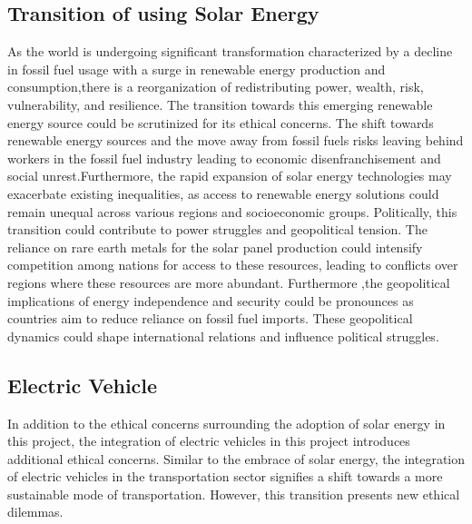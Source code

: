 \documentclass[10pt,twocolumn]{article}
\begin{document}
\subsection{Transition of using Solar Energy}
As the world is undergoing significant transformation characterized by a decline in fossil fuel usage with a surge in renewable energy production and consumption,there is a reorganization of redistributing power, wealth, risk, vulnerability, and resilience. The transition towards this emerging renewable energy source could be scrutinized for its ethical concerns. The shift towards renewable energy sources and the move away from fossil fuels risks leaving behind workers in the fossil fuel industry leading to economic disenfranchisement and social unrest.Furthermore, the rapid expansion of solar energy technologies may exacerbate existing inequalities, as access to renewable energy solutions could remain unequal across various regions and socioeconomic groups. Politically, this transition could contribute to power struggles and geopolitical tension. The reliance on rare earth metals for the solar panel production could intensify competition among nations for access to these resources, leading to conflicts over regions where these resources are more abundant. Furthermore ,the geopolitical implications of energy independence and security could be pronounces as countries aim to reduce reliance on fossil fuel imports. These geopolitical dynamics could shape international relations and influence political struggles. 
\subsection{Electric Vehicle}
In addition to the ethical concerns surrounding the adoption of solar energy in this project, the integration of electric vehicles in this project introduces additional ethical concerns. Similar to the embrace of solar energy, the integration of electric vehicles in the transportation sector signifies a shift towards a more sustainable mode of transportation. However, this transition presents new ethical dilemmas.   
\end{document}
